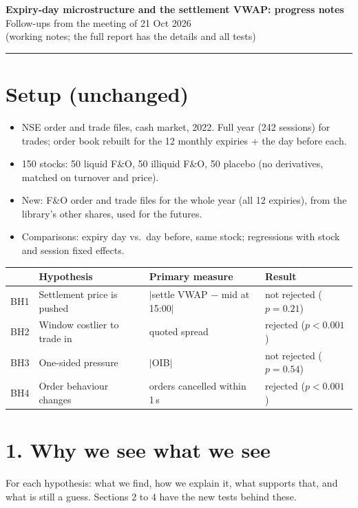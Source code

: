 \documentclass[11pt]{article}
\begin{document}
{\large\textbf{Expiry-day microstructure and the settlement VWAP: progress notes}}\\
Follow-ups from the meeting of 21 Oct 2026\\
\small{(working notes; the full report has the details and all tests)}
\normalsize

\hrule
\vspace{0.8em}

\section*{Setup (unchanged)}
\begin{itemize}
  \item NSE order and trade files, cash market, 2022. Full year (242 sessions) for trades;
  order book rebuilt for the 12 monthly expiries + the day before each.
  \item 150 stocks: 50 liquid F\&O, 50 illiquid F\&O, 50 placebo (no derivatives, matched on
  turnover and price).
  \item New: F\&O order and trade files for the whole year (all 12 expiries), from the
  library's other shares, used for the futures.
  \item Comparisons: expiry day vs.\ day before, same stock; regressions with stock and
  session fixed effects.
\end{itemize}

\begin{center}
\small
\begin{tabular}{llll}
\toprule
 & Hypothesis & Primary measure & Result \\
\midrule
BH1 & Settlement price is pushed & $|$settle VWAP $-$ mid at 15:00$|$ & not rejected ($p=0.21$) \\
BH2 & Window costlier to trade in & quoted spread & rejected ($p<0.001$) \\
BH3 & One-sided pressure & $|$OIB$|$ & not rejected ($p=0.54$) \\
BH4 & Order behaviour changes & orders cancelled within 1\,s & rejected ($p<0.001$) \\
\bottomrule
\end{tabular}
\end{center}

\section*{1. Why we see what we see}
For each hypothesis: what we find, how we explain it, what supports that, and what is still a
guess. Sections 2 to 4 have the new tests behind these.
\end{document}
